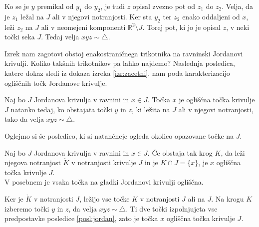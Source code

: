 \documentclass[mat1]{fmfdelo}
\newcommand{\R}{\mathbb R}
\begin{document}
Ko se je $y$ premikal od $y_1$ do $y_2$, je tudi $z$ opisal zvezno pot od $z_1$ do $z_2$. Velja, da je $z_1$ ležal na $J$ ali v njegovi notranjosti. Ker sta $y_2$ ter $z_2$ enako oddaljeni od $x$, leži $z_2$ na $J$ ali v neomejeni komponenti $\R^2 \setminus J$. Torej pot, ki jo je opisal $z$, v neki točki seka $J$. Tedaj velja $xyz \sim \triangle$.

\begin{center}
\end{center}
\endproof

Izrek nam zagotovi obstoj enakostraničnega trikotnika na ravninski Jordanovi krivulji. Koliko takšnih trikotnikov pa lahko najdemo? Naslednja posledica, katere dokaz sledi iz dokaza izreka \ref{izr:zacetni}, nam poda karakterizacijo ogliščnih točk Jordanove krivulje.
\begin{posledica}\label{posl:jordan}
Naj bo $J$ Jordanova krivulja v ravnini in $x \in J$. Točka $x$ je ogliščna točka krivulje $J$ natanko tedaj, ko obstajata točki $y$ in $z$, ki ležita na $J$ ali v njegovi notranjosti, tako da velja $xyz \sim \triangle$.
\end{posledica}

Oglejmo si še posledico, ki si natančneje ogleda okolico opazovane točke na $J$.
\begin{posledica}
Naj bo $J$ Jordanova krivulja v ravnini in $x \in J$. Če obstaja tak krog $K$, da leži njegova notranjost $\mathring{K}$ v notranjosti krivulje $J$ in je $K \cap J = \{x\}$, je $x$ ogliščna točka krivulje $J$.\\
V posebnem je vsaka točka na gladki Jordanovi krivulji ogliščna.
\end{posledica}
\proof
Ker je $\mathring{K}$ v notranjosti $J$, ležijo vse točke $K$ v notranjosti $J$ ali na $J$. Na krogu $K$ izberemo točki $y$ in $z$, da velja $xyz \sim \triangle$. Ti dve točki izpolnjujeta vse predpostavke posledice \ref{posl:jordan}, zato je točka $x$ ogliščna točka krivulje $J$.
\endproof
\end{document}
